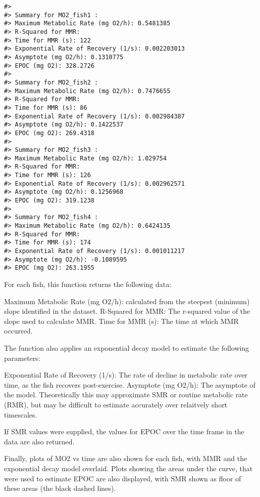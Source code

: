 \documentclass[
]{article}
\begin{document}
\begin{verbatim}
#> 
#> Summary for MO2_fish1 :
#> Maximum Metabolic Rate (mg O2/h): 0.5481385 
#> R-Squared for MMR: 
#> Time for MMR (s): 122 
#> Exponential Rate of Recovery (1/s): 0.002203013 
#> Asymptote (mg O2/h): 0.1310775 
#> EPOC (mg O2): 328.2726 
#> 
#> Summary for MO2_fish2 :
#> Maximum Metabolic Rate (mg O2/h): 0.7476655 
#> R-Squared for MMR: 
#> Time for MMR (s): 86 
#> Exponential Rate of Recovery (1/s): 0.002984387 
#> Asymptote (mg O2/h): 0.1422537 
#> EPOC (mg O2): 269.4318 
#> 
#> Summary for MO2_fish3 :
#> Maximum Metabolic Rate (mg O2/h): 1.029754 
#> R-Squared for MMR: 
#> Time for MMR (s): 126 
#> Exponential Rate of Recovery (1/s): 0.002962571 
#> Asymptote (mg O2/h): 0.1256968 
#> EPOC (mg O2): 319.1238 
#> 
#> Summary for MO2_fish4 :
#> Maximum Metabolic Rate (mg O2/h): 0.6424135 
#> R-Squared for MMR: 
#> Time for MMR (s): 174 
#> Exponential Rate of Recovery (1/s): 0.001011217 
#> Asymptote (mg O2/h): -0.1089595 
#> EPOC (mg O2): 263.1955
\end{verbatim}

For each fish, this function returns the following data:

Maximum Metabolic Rate (mg O2/h): calculated from the steepest (minimum)
slope identified in the dataset. R-Squared for MMR: The r-squared value
of the slope used to calculate MMR. Time for MMR (s): The time at which
MMR occurred.

The function also applies an exponential decay model to estimate the
following parameters:

Exponential Rate of Recovery (1/s): The rate of decline in metabolic
rate over time, as the fish recovers post-exercise. Asymptote (mg O2/h):
The asymptote of the model. Theoretically this may approximate SMR or
routine metabolic rate (RMR), but may be difficult to estimate
accurately over relaitvely short timescales.

If SMR values were supplied, the values for EPOC over the time frame in
the data are also returned.

Finally, plots of MO2 vs time are also shown for each fish, with MMR and
the exponential decay model overlaid. Plots showing the areas under the
curve, that were used to estimate EPOC are also displayed, with SMR
shown as floor of these areas (the black dashed lines).
\end{document}
